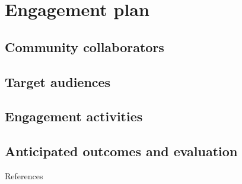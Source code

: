 \documentclass[12pt]{elsarticle}
\begin{document}
%
\section{Engagement plan}
\subsection{Community collaborators} 
\subsection{Target audiences}
\subsection{Engagement activities}
\subsection{Anticipated outcomes and evaluation}

\clearpage
\large References\\
\normalsize

\end{document}
